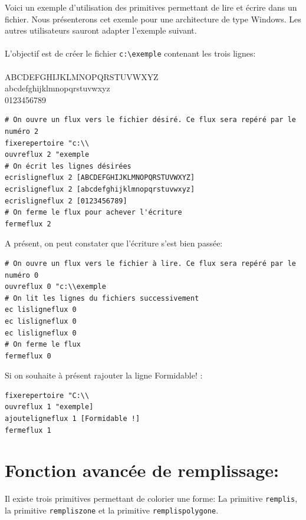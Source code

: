 Voici un exemple d'utilisation des primitives permettant de lire et écrire dans un fichier. Nous présenterons cet exemle pour une architecture de type Windows. Les autres utilisateurs sauront adapter l'exemple suivant.\\ \\
\noindent
L'objectif est de créer le fichier \texttt{c:\textbackslash exemple} contenant les trois lignes:\\ \\
ABCDEFGHIJKLMNOPQRSTUVWXYZ \\ 
abcdefghijklmnopqrstuvwxyz \\
0123456789 \\

\begin{verbatim}
# On ouvre un flux vers le fichier désiré. Ce flux sera repéré par le numéro 2
fixerepertoire "c:\\
ouvreflux 2 "exemple
# On écrit les lignes désirées
ecrisligneflux 2 [ABCDEFGHIJKLMNOPQRSTUVWXYZ]
ecrisligneflux 2 [abcdefghijklmnopqrstuvwxyz]
ecrisligneflux 2 [0123456789]
# On ferme le flux pour achever l'écriture
fermeflux 2
\end{verbatim}
A présent, on peut constater que l'écriture s'est bien passée:
\begin{verbatim}
# On ouvre un flux vers le fichier à lire. Ce flux sera repéré par le numéro 0
ouvreflux 0 "c:\\exemple
# On lit les lignes du fichiers successivement
ec lisligneflux 0
ec lisligneflux 0
ec lisligneflux 0
# On ferme le flux
fermeflux 0
\end{verbatim}
\noindent Si on souhaite à présent rajouter la ligne \og Formidable! \fg:
\begin{verbatim}
fixerepertoire "C:\\
ouvreflux 1 "exemple]
ajouteligneflux 1 [Formidable !]
fermeflux 1
\end{verbatim}
\section{Fonction avancée de remplissage:}
Il existe trois primitives permettant de colorier une forme:  La primitive \texttt{remplis},   la primitive \texttt{rempliszone} et la primitive \texttt{remplispolygone}.
